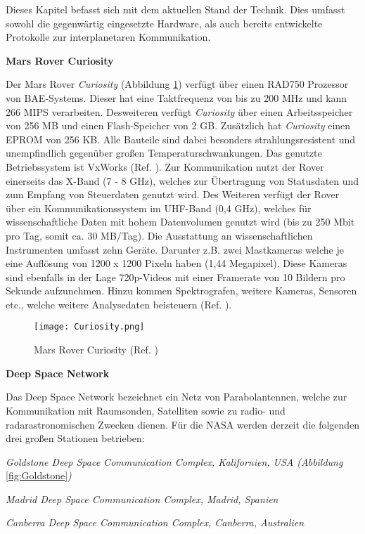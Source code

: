 \label{cap:standDerTechnik}
Dieses Kapitel befasst sich mit dem aktuellen Stand der Technik. Dies
umfasst sowohl die gegenw{\"a}rtig eingesetzte Hardware, als auch bereits
entwickelte Protokolle zur interplanetaren Kommunikation.

\textbf{Mars Rover Curiosity} 

Der Mars Rover \textit{Curiosity} (Abbildung \ref{fig:Curiosity}) verf{\"u}gt
{\"u}ber einen RAD750 Prozessor von BAE-Systems.
Dieser hat eine Taktfrequenz von bis zu 200 MHz und kann 266 MIPS
verarbeiten. Desweiteren verf{\"u}gt \textit{Curiosity} {\"u}ber einen
Arbeitsspeicher von 256 MB und einen Flash-Speicher von 2 GB. Zus{\"a}tzlich hat
\textit{Curiosity} einen EPROM von 256 KB. Alle Bauteile sind dabei besonders
strahlungsresistent und unempfindlich gegen{\"u}ber gro{\ss}en
Temperaturschwankungen. Das genutzte Betriebssystem ist VxWorks (Ref.
\cite{WR}).
Zur Kommunikation nutzt der Rover einerseits das X-Band (7 - 8 GHz), welches zur
{\"U}bertragung von Statusdaten und zum Empfang von Steuerdaten genutzt wird.
Des Weiteren verf{\"u}gt der Rover {\"u}ber ein Kommunikationssystem im UHF-Band
(0,4 GHz), welches f{\"u}r wissenschaftliche Daten mit hohem Datenvolumen
genutzt wird (bis zu 250 Mbit pro Tag, somit ca. 30 MB/Tag). Die Ausstattung an
wissenschaftlichen Instrumenten umfasst zehn Ger{\"a}te. Darunter z.B. zwei
Mastkameras welche je eine Aufl{\"o}sung von 1200 x 1200 Pixeln haben (1,44
Megapixel). Diese Kameras sind ebenfalls in der Lage 720p-Videos mit einer
Framerate von 10 Bildern pro Sekunde aufzunehmen. Hinzu kommen Spektrografen,
weitere Kameras, Sensoren etc., welche weitere Analysedaten beisteuern (Ref.
\cite{web5}).

\begin{figure}[H]
\centering
\texttt{[image: Curiosity.png]}
\caption[Mars Rover Curiosity]{Mars Rover Curiosity (Ref. \cite{imgCuriosity})}
\label{fig:Curiosity}
\end{figure}

\textbf{Deep Space Network}

Das Deep Space Network bezeichnet ein Netz von Parabolantennen, welche zur
Kommunikation mit Raumsonden, Satelliten sowie zu radio-
und radarastronomischen Zwecken dienen. F{\"u}r die NASA werden derzeit die
folgenden drei gro{\ss}en Stationen betrieben:

\begin{compactenum}[a)]
\item \textit{Goldstone Deep Space Communication Complex, Kalifornien, USA
(Abbildung} \ref{fig:Goldstone}\textit{)}
\item \textit{Madrid Deep Space Communication Complex, Madrid, Spanien}
\item \textit{Canberra Deep Space Communication Complex, Canberra, Australien}
\end{compactenum}

